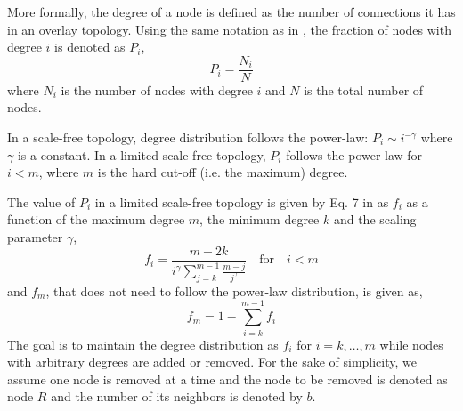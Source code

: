 More formally, the degree of a node is defined as the number of connections it has in an overlay topology. Using the same notation as in \cite{bulut2014constructing}, the fraction of nodes with degree $i$ is denoted as $P_i$,
\begin{equation}
P_i = \frac{N_i}{N}
\end{equation}
where $N_i$ is the number of nodes with degree $i$ and $N$ is the total number of nodes. 

In a scale-free topology, degree distribution follows the power-law: $P_i \sim i^{-\gamma}$ where $\gamma$ is a constant. In a limited scale-free topology, $P_i$ follows the power-law for $i<m$, where $m$ is the hard cut-off (i.e. the maximum) degree.

The value of $P_i$ in a limited scale-free topology is given by Eq. 7 in \cite{bulut2014constructing} as $f_i$ as a function of the maximum degree $m$, the minimum degree $k$ and the scaling parameter $\gamma$, 
\begin{equation} \label{eq:fi1}
f_i = \frac{m - 2 k}{ i^\gamma \sum_{j=k}^{m-1} \frac{m-j}{j^\gamma}}  \quad \text{for} \quad i < m
\end{equation}
and $f_m$, that does not need to follow the power-law distribution, is given as,
\begin{equation} \label{eq:fi2}
f_m = 1 - \sum_{i=k}^{m-1} f_i
\end{equation}
The goal is to maintain the degree distribution as $f_i$ for $i=k,\ldots,m$ while nodes with arbitrary degrees are added or removed. For the sake of simplicity, we assume one node is removed at a time and the node to be removed is denoted as node $R$ and the number of its neighbors is denoted by $b$.

